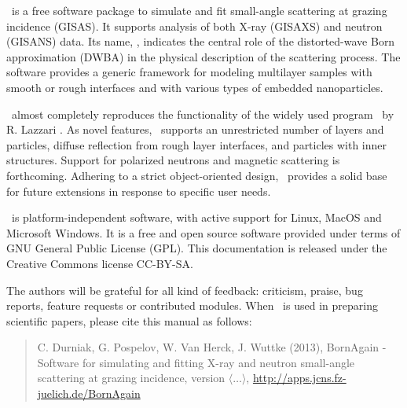 \newpage
{}


\BornAgain\ is a free software package to simulate and fit small-angle
scattering at grazing incidence (GISAS). 
It supports analysis of both  X-ray (GISAXS) and neutron (GISANS) data.
Its name, \BornAgain, indicates the central role of the distorted-wave Born
approximation (DWBA) in the physical description of the
scattering process. The software provides a generic framework for modeling multilayer samples with smooth or
rough interfaces and with various types of embedded nano\-particles.

\BornAgain\ almost completely reproduces the functionality
of the widely used program \IsGISAXS\
by R. Lazzari \cite{Laz02}.
As novel features, \BornAgain\
supports an unrestricted number of layers and particles, 
diffuse reflection from rough layer interfaces,
and particles with inner structures.
Support for polarized neutrons and magnetic scattering is forthcoming.
Adhering to a strict object-oriented design,
\BornAgain\ provides a solid base for future extensions
in response to specific user needs.

\BornAgain\ is platform-independent software,
with active support for Linux, MacOS and 
Microsoft Windows. 
It is a free and open source software provided under terms
of GNU General Public License (GPL).
This documentation is released under the Creative Commons license CC-BY-SA.

The authors will be grateful for all kind of
feedback: criticism, praise, bug reports, feature requests
or contributed modules.
When \BornAgain\ is used in preparing scientific papers,
please cite this manual as follows: 
\begin{quote}
C. Durniak, G. Pospelov, W. Van Herck, J. Wuttke (2013),\newline
BornAgain - Software for simulating and fitting
X-ray and neutron small-angle scattering at grazing incidence,
version $\langle\ldots\rangle$,\newline
\url{http://apps.jcns.fz-juelich.de/BornAgain}
\end{quote}



